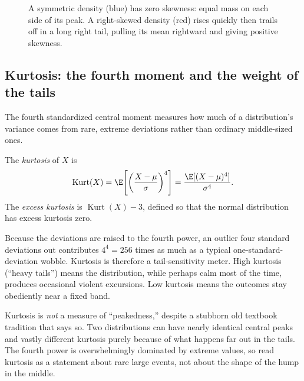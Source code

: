 \begin{figure}[H]
\centering
{}
\caption{A symmetric density (blue) has zero skewness: equal mass on each
side of its peak. A right-skewed density (red) rises quickly then trails off
in a long right tail, pulling its mean rightward and giving positive
skewness.}
\label{ch09:fig-skew}
\end{figure}

\subsection{Kurtosis: the fourth moment and the weight of the tails}

The fourth standardized central moment measures how much of a distribution's
variance comes from rare, extreme deviations rather than ordinary
middle-sized ones.

\begin{definition}[Kurtosis]
\label{ch09:def-kurt}
The \emph{kurtosis} of $X$ is
\[
  \operatorname{Kurt}(X) = \E\!\left[\left(\frac{X-\mu}{\sigma}\right)^{4}\right]
  = \frac{\E[(X-\mu)^4]}{\sigma^4}.
\]
The \emph{excess kurtosis} is $\operatorname{Kurt}(X) - 3$, defined so that the
normal distribution has excess kurtosis zero.
\end{definition}

Because the deviations are raised to the fourth power, an outlier four
standard deviations out contributes $4^4 = 256$ times as much as a typical
one-standard-deviation wobble. Kurtosis is therefore a tail-sensitivity meter.
High kurtosis (``heavy tails'') means the distribution, while perhaps calm
most of the time, produces occasional violent excursions. Low kurtosis means
the outcomes stay obediently near a fixed band.

\begin{trapbox}
Kurtosis is \emph{not} a measure of ``peakedness,'' despite a stubborn old
textbook tradition that says so. Two distributions can have nearly identical
central peaks and vastly different kurtosis purely because of what happens far
out in the tails. The fourth power is overwhelmingly dominated by extreme
values, so read kurtosis as a statement about rare large events, not about
the shape of the hump in the middle.
\end{trapbox}


